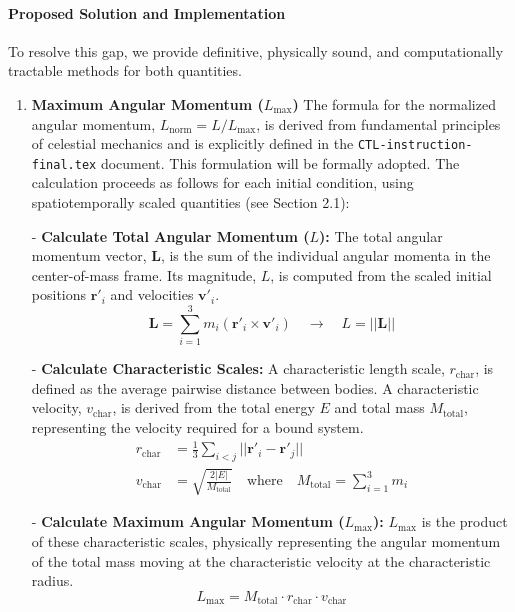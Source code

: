 \paragraph{Proposed Solution and Implementation}
To resolve this gap, we provide definitive, physically sound, and computationally tractable methods for both quantities.

\begin{enumerate}
    \item \textbf{Maximum Angular Momentum ($L_{\max}$)}
    The formula for the normalized angular momentum, $L_{\text{norm}} = L/L_{\max}$, is derived from fundamental principles of celestial mechanics and is explicitly defined in the \texttt{CTL-instruction-final.tex} document. This formulation will be formally adopted. The calculation proceeds as follows for each initial condition, using spatiotemporally scaled quantities (see Section 2.1):


- \textbf{Calculate Total Angular Momentum ($L$):} The total angular momentum vector, $\mathbf{L}$, is the sum of the individual angular momenta in the center-of-mass frame. Its magnitude, $L$, is computed from the scaled initial positions $\mathbf{r}'_i$ and velocities $\mathbf{v}'_i$.
        \begin{equation}
            \mathbf{L} = \sum_{i=1}^{3} m_i (\mathbf{r}'_i \times \mathbf{v}'_i) \quad \rightarrow \quad L = ||\mathbf{L}||
        \end{equation}

- \textbf{Calculate Characteristic Scales:} A characteristic length scale, $r_{\text{char}}$, is defined as the average pairwise distance between bodies. A characteristic velocity, $v_{\text{char}}$, is derived from the total energy $E$ and total mass $M_{\text{total}}$, representing the velocity required for a bound system.
        \begin{align}
            r_{\text{char}} &= \frac{1}{3} \sum_{i<j} ||\mathbf{r}'_i - \mathbf{r}'_j|| \\
            v_{\text{char}} &= \sqrt{\frac{2|E|}{M_{\text{total}}}} \quad \text{where} \quad M_{\text{total}} = \sum_{i=1}^{3} m_i
        \end{align}

- \textbf{Calculate Maximum Angular Momentum ($L_{\max}$):} $L_{\max}$ is the product of these characteristic scales, physically representing the angular momentum of the total mass moving at the characteristic velocity at the characteristic radius.
        \begin{equation}
            L_{\max} = M_{\text{total}} \cdot r_{\text{char}} \cdot v_{\text{char}}
        \end{equation}


\end{enumerate}

